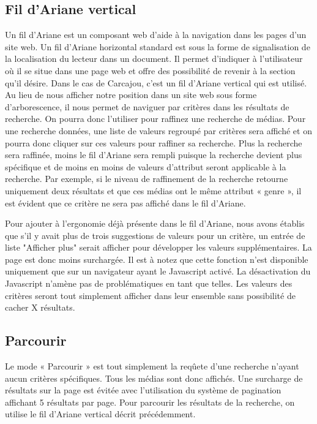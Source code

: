 \documentclass[letter, 11pt]{report}
\begin{document}
\subsection{Fil d'Ariane vertical}
Un fil d'Ariane est un composant web d'aide à la navigation dans les pages d'un site web. Un fil d'Ariane horizontal standard est sous la forme de signalisation de la localisation du lecteur dans un document. Il permet d'indiquer à l'utilisateur où il se situe dans une page web et offre des possibilité de revenir à la section qu'il désire.  Dans le cas de Carcajou, c'est un fil d'Ariane vertical qui est utilisé. Au lieu de nous afficher notre position dans un site web sous forme d'arborescence, il nous permet de naviguer par critères dans les résultats de recherche. On pourra donc l'utiliser pour raffinez une recherche de médias. Pour une recherche données, une liste de valeurs regroupé par critères sera affiché et on pourra donc cliquer sur ces valeurs pour raffiner sa recherche. Plus la recherche sera raffinée, moins le fil d'Ariane sera rempli puisque la recherche devient plus spécifique et de moins en moins de valeurs d'attribut seront applicable à la recherche. Par exemple, si le niveau de raffinement de la recherche retourne uniquement deux résultats et que ces médias ont le même attribut « genre », il est évident que ce critère ne sera pas affiché dans le fil d'Ariane.

Pour ajouter à l'ergonomie déjà présente dans le fil d'Ariane, nous avons établis que s'il y avait plus de trois suggestions de valeurs pour un critère, un entrée de liste "Afficher plus" serait afficher pour développer les valeurs supplémentaires. La page est donc moins surchargée. Il est à notez que cette fonction n'est disponible uniquement que sur un navigateur ayant le Javascript activé. La désactivation du Javascript n'amène pas de problématiques en tant que telles. Les valeurs des critères seront tout simplement afficher dans leur ensemble sans possibilité de cacher X résultats.

\subsection{Parcourir}
Le mode « Parcourir » est tout simplement la reqûete d'une recherche n'ayant aucun critères spécifiques. Tous les médias sont donc affichés. Une surcharge de résultats sur la page est évitée avec l'utilisation du système de pagination affichant 5 résultats par page. Pour parcourir les résultats de la recherche, on utilise le fil d'Ariane vertical décrit précédemment.
\end{document}
